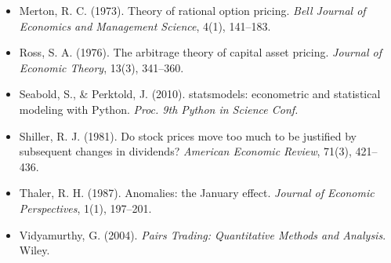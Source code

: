 \documentclass[11pt,a4paper]{article}
\begin{document}
\begin{itemize}[leftmargin=1.2em,labelsep=0.4em,label={}]
\item Merton, R. C. (1973). Theory of rational option pricing. \emph{Bell Journal of Economics and Management Science}, 4(1), 141--183.
\item Ross, S. A. (1976). The arbitrage theory of capital asset pricing. \emph{Journal of Economic Theory}, 13(3), 341--360.
\item Seabold, S., \& Perktold, J. (2010). statsmodels: econometric and statistical modeling with Python. \emph{Proc. 9th Python in Science Conf.}
\item Shiller, R. J. (1981). Do stock prices move too much to be justified by subsequent changes in dividends? \emph{American Economic Review}, 71(3), 421--436.
\item Thaler, R. H. (1987). Anomalies: the January effect. \emph{Journal of Economic Perspectives}, 1(1), 197--201.
\item Vidyamurthy, G. (2004). \emph{Pairs Trading: Quantitative Methods and Analysis}. Wiley.
\end{itemize}
\end{document}

